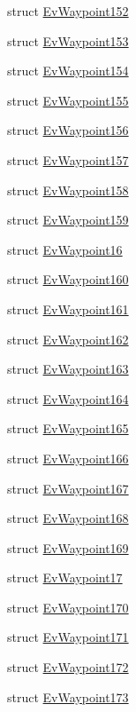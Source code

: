 \begin{DoxyCompactItemize}
struct \hyperlink{structsmacc_1_1EvWaypoint152}{Ev\+Waypoint152}
\item 
struct \hyperlink{structsmacc_1_1EvWaypoint153}{Ev\+Waypoint153}
\item 
struct \hyperlink{structsmacc_1_1EvWaypoint154}{Ev\+Waypoint154}
\item 
struct \hyperlink{structsmacc_1_1EvWaypoint155}{Ev\+Waypoint155}
\item 
struct \hyperlink{structsmacc_1_1EvWaypoint156}{Ev\+Waypoint156}
\item 
struct \hyperlink{structsmacc_1_1EvWaypoint157}{Ev\+Waypoint157}
\item 
struct \hyperlink{structsmacc_1_1EvWaypoint158}{Ev\+Waypoint158}
\item 
struct \hyperlink{structsmacc_1_1EvWaypoint159}{Ev\+Waypoint159}
\item 
struct \hyperlink{structsmacc_1_1EvWaypoint16}{Ev\+Waypoint16}
\item 
struct \hyperlink{structsmacc_1_1EvWaypoint160}{Ev\+Waypoint160}
\item 
struct \hyperlink{structsmacc_1_1EvWaypoint161}{Ev\+Waypoint161}
\item 
struct \hyperlink{structsmacc_1_1EvWaypoint162}{Ev\+Waypoint162}
\item 
struct \hyperlink{structsmacc_1_1EvWaypoint163}{Ev\+Waypoint163}
\item 
struct \hyperlink{structsmacc_1_1EvWaypoint164}{Ev\+Waypoint164}
\item 
struct \hyperlink{structsmacc_1_1EvWaypoint165}{Ev\+Waypoint165}
\item 
struct \hyperlink{structsmacc_1_1EvWaypoint166}{Ev\+Waypoint166}
\item 
struct \hyperlink{structsmacc_1_1EvWaypoint167}{Ev\+Waypoint167}
\item 
struct \hyperlink{structsmacc_1_1EvWaypoint168}{Ev\+Waypoint168}
\item 
struct \hyperlink{structsmacc_1_1EvWaypoint169}{Ev\+Waypoint169}
\item 
struct \hyperlink{structsmacc_1_1EvWaypoint17}{Ev\+Waypoint17}
\item 
struct \hyperlink{structsmacc_1_1EvWaypoint170}{Ev\+Waypoint170}
\item 
struct \hyperlink{structsmacc_1_1EvWaypoint171}{Ev\+Waypoint171}
\item 
struct \hyperlink{structsmacc_1_1EvWaypoint172}{Ev\+Waypoint172}
\item 
struct \hyperlink{structsmacc_1_1EvWaypoint173}{Ev\+Waypoint173}

\end{DoxyCompactItemize}
